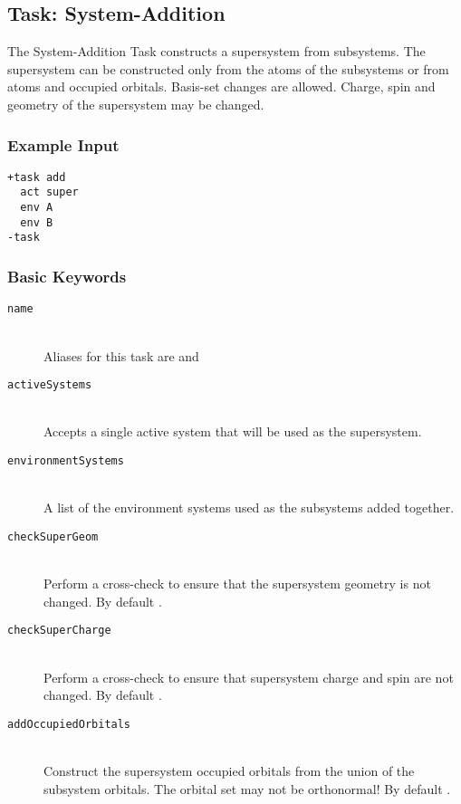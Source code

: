 \subsection{Task: System-Addition}\label{task: addition}
The System-Addition Task constructs a supersystem from subsystems. The supersystem can be constructed only from the atoms of the subsystems or from atoms and occupied orbitals. Basis-set changes are allowed. Charge, spin and geometry of the supersystem may be changed.
\subsubsection{Example Input}
\begin{lstlisting}
+task add
  act super
  env A
  env B
-task
\end{lstlisting}
\subsubsection{Basic Keywords}
\begin{description}
	\item[\texttt{name}]\hfill \\
	Aliases for this task are  and 
	\item[\texttt{activeSystems}]\hfill \\
	Accepts a single active system that will be used as the supersystem.
	\item[\texttt{environmentSystems}]\hfill \\
	A list of the environment systems used as the subsystems added together.
	\item[\texttt{checkSuperGeom}]\hfill \\
	Perform a cross-check to ensure that the supersystem geometry is not changed. By default .
	\item[\texttt{checkSuperCharge}]\hfill \\
	Perform a cross-check to ensure that supersystem charge and spin are not changed. By default .
	\item[\texttt{addOccupiedOrbitals}]\hfill \\
	Construct the supersystem occupied orbitals from the union of the subsystem orbitals. The orbital set may not be orthonormal! By default .
\end{description}
